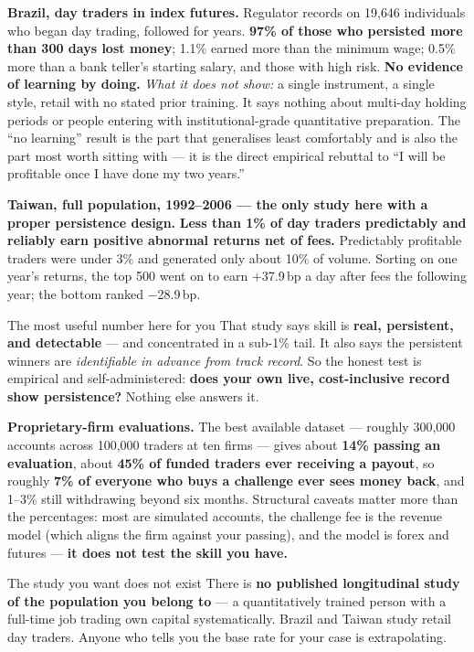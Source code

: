\documentclass[11pt,a4paper]{article}
\begin{document}
\textbf{Brazil, day traders in index futures.} Regulator records on 19{,}646
individuals who began day trading, followed for years. \textbf{97\% of those who
persisted more than 300 days lost money}; 1.1\% earned more than the minimum wage;
0.5\% more than a bank teller's starting salary, and those with high risk.
\textbf{No evidence of learning by doing.} \emph{What it does not show:} a single
instrument, a single style, retail with no stated prior training. It says nothing
about multi-day holding periods or people entering with institutional-grade
quantitative preparation. The ``no learning'' result is the part that generalises
least comfortably and is also the part most worth sitting with --- it is the direct
empirical rebuttal to ``I will be profitable once I have done my two years.''

\textbf{Taiwan, full population, 1992--2006 --- the only study here with a proper
persistence design.} \textbf{Less than 1\% of day traders predictably and reliably
earn positive abnormal returns net of fees.} Predictably profitable traders were
under 3\% and generated only about 10\% of volume. Sorting on one year's returns,
the top 500 went on to earn $+$37.9\,bp a day after fees the following year; the
bottom ranked $-$28.9\,bp.

\begin{keyfact}{The most useful number here for you}
That study says skill is \textbf{real, persistent, and detectable} --- and
concentrated in a sub-1\% tail. It also says the persistent winners are
\emph{identifiable in advance from track record}. So the honest test is empirical
and self-administered: \textbf{does your own live, cost-inclusive record show
persistence?} Nothing else answers it.
\end{keyfact}

\textbf{Proprietary-firm evaluations.} The best available dataset --- roughly
300{,}000 accounts across 100{,}000 traders at ten firms --- gives about
\textbf{14\% passing an evaluation}, about \textbf{45\% of funded traders ever
receiving a payout}, so roughly \textbf{7\% of everyone who buys a challenge ever
sees money back}, and 1--3\% still withdrawing beyond six months. Structural
caveats matter more than the percentages: most are simulated accounts, the
challenge fee is the revenue model (which aligns the firm against your passing),
and the model is forex and futures --- \textbf{it does not test the skill you have.}

\begin{keyfact}{The study you want does not exist}
There is \textbf{no published longitudinal study of the population you belong to}
--- a quantitatively trained person with a full-time job trading own capital
systematically. Brazil and Taiwan study retail day traders. Anyone who tells you
the base rate for your case is extrapolating.
\end{keyfact}
\end{document}
